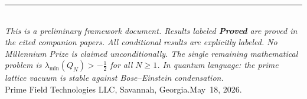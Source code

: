 \documentclass[12pt]{article}
\newcommand{\half}{\tfrac{1}{2}}
\begin{document}
\vspace{1.4em}
\noindent\rule{\textwidth}{0.4pt}\\[5pt]
\noindent\small\textit{%
This is a preliminary framework document.
Results labeled \textbf{Proved} are proved in the cited companion papers.
All conditional results are explicitly labeled.
No Millennium Prize is claimed unconditionally.
The single remaining mathematical problem is
$\lambda_{\min}(Q_N) > -\half$ for all $N\ge1$.
In quantum language: the prime lattice vacuum is stable
against Bose--Einstein condensation.}\\[4pt]
\noindent\small Prime Field Technologies LLC,
Savannah, Georgia.\quad May~18, 2026.
\end{document}
